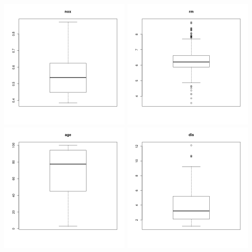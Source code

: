 \documentclass{article}
\begin{document}
\includegraphics[width=2.5in]{5.png}
\includegraphics[width=2.5in]{6.png}
\includegraphics[width=2.5in]{7.png}
\includegraphics[width=2.5in]{8.png}
\end{document}
